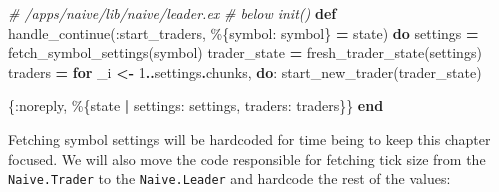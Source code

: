 \documentclass[
]{book}
\newenvironment{Shaded}{\begin{snugshade}}{\end{snugshade}}
\newcommand{\CommentTok}[1]{\textcolor[rgb]{0.56,0.35,0.01}{\textit{#1}}}
\newcommand{\DecValTok}[1]{\textcolor[rgb]{0.00,0.00,0.81}{#1}}
\newcommand{\KeywordTok}[1]{\textcolor[rgb]{0.13,0.29,0.53}{\textbf{#1}}}
\newcommand{\NormalTok}[1]{#1}
\newcommand{\OperatorTok}[1]{\textcolor[rgb]{0.81,0.36,0.00}{\textbf{#1}}}
\newcommand{\VariableTok}[1]{\textcolor[rgb]{0.00,0.00,0.00}{#1}}
\begin{document}
\begin{Shaded}
\begin{Highlighting}[]
  \CommentTok{\# /apps/naive/lib/naive/leader.ex}
  \CommentTok{\# below init()}
  \KeywordTok{def}\NormalTok{ handle\_continue(}\VariableTok{:start\_traders}\NormalTok{, \%\{}\VariableTok{symbol:}\NormalTok{ symbol\} }\OperatorTok{=}\NormalTok{ state) }\KeywordTok{do}
\NormalTok{    settings }\OperatorTok{=}\NormalTok{ fetch\_symbol\_settings(symbol)}
\NormalTok{    trader\_state }\OperatorTok{=}\NormalTok{ fresh\_trader\_state(settings)}
\NormalTok{    traders }\OperatorTok{=} \KeywordTok{for}\NormalTok{ \_i }\OperatorTok{\textless{}{-}} \DecValTok{1}\OperatorTok{..}\NormalTok{settings}\OperatorTok{.}\NormalTok{chunks,}
              \KeywordTok{do}\NormalTok{: start\_new\_trader(trader\_state)}

\NormalTok{    \{}\VariableTok{:noreply}\NormalTok{, \%\{state }\OperatorTok{|} \VariableTok{settings:}\NormalTok{ settings, }\VariableTok{traders:}\NormalTok{ traders\}\}}
  \KeywordTok{end}
\end{Highlighting}
\end{Shaded}

Fetching symbol settings will be hardcoded for time being to keep this chapter focused. We will also move the code responsible for fetching tick
size from the \texttt{Naive.Trader} to the \texttt{Naive.Leader} and hardcode the rest of the values:
\end{document}

